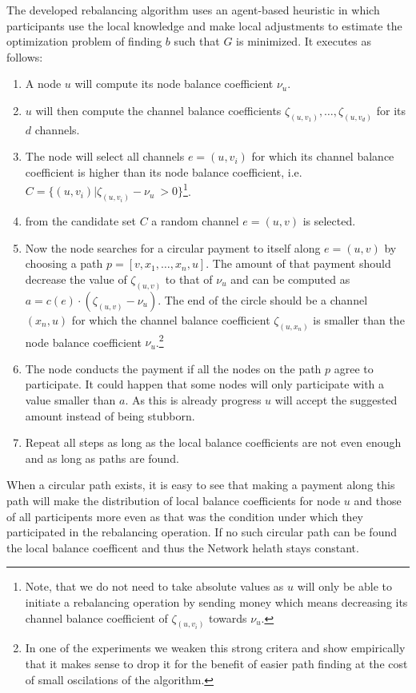 \documentclass[a4paper]{paper}
\begin{document}
The developed rebalancing algorithm uses an agent-based heuristic in which participants use the local knowledge and make local adjustments to estimate the optimization problem of finding $b$ such that $G$ is minimized.
It executes as follows:
\begin{enumerate}
\item A node $u$ will compute its node balance coefficient $\nu_u$.
\item $u$ will then compute the channel balance coefficients $\zeta_{(u,v_1)},\dots,\zeta_{(u,v_d)}$ for its $d$ channels.
\item The node will select all channels $e=(u,v_i)$ for which its channel balance coefficient is higher 
than its node balance coefficient, i.e.~$C = \{(u,v_i) | \zeta_{(u,v_i)} - \nu_u\ > 0\}$\footnote{
  Note, that we do not need to take absolute values as $u$ will only be able to initiate a rebalancing operation by sending money which means decreasing its channel balance coefficient of $\zeta_{(u,v_i)}$ towards $\nu_u$.}.
\item from the candidate set $C$ a random channel $e=(u,v)$ is selected.
\item Now the node searches for a circular payment to itself along $e=(u,v)$ by choosing a path $p = [v,x_1,\dots,x_n,u]$. The amount of that payment should decrease the value of $\zeta_{(u,v)}$ to that of $\nu_u$ and can be computed as $a = c(e)\cdot (\zeta_{(u,v)}-\nu_u)$. The end of the circle should be a channel $(x_n,u)$ for which the channel balance coefficient $\zeta_{(u,x_n)}$ is smaller than the node balance coefficient $\nu_u$.\footnote{In one of the experiments we weaken this strong critera and show empirically that it makes sense to drop it for the benefit of easier path finding at the cost of small oscilations of the algorithm.}
\item The node conducts the payment if all the nodes on the path $p$ agree to participate. It could happen that some nodes will only participate with a value smaller than $a$. As this is already progress $u$ will accept the suggested amount instead of being stubborn. 
\item Repeat all steps as long as the local balance coefficients are not even enough and as long as paths are found.
\end{enumerate}

When a circular path exists, it is easy to see that making a payment along this path will make the distribution of local balance coefficients for node $u$ and those of all participents more even as that was the condition under which they participated in the rebalancing operation.
If no such circular path can be found the local balance coefficent and thus the Network helath stays constant.
\end{document}
